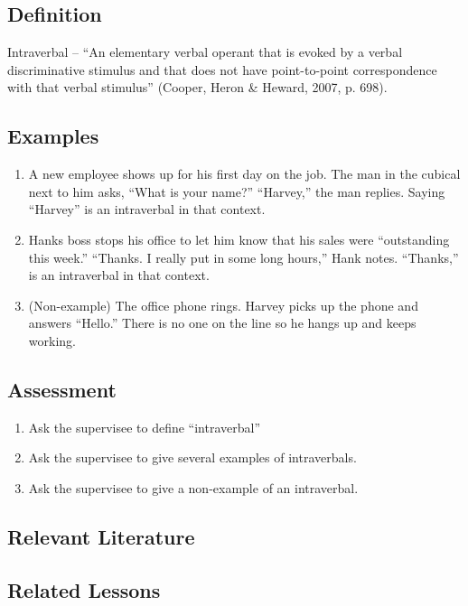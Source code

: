 \subsection{Definition} 
Intraverbal – ``An elementary verbal operant that is evoked by a verbal discriminative stimulus and that does not have point-to-point correspondence with that verbal stimulus'' (Cooper, Heron \& Heward, 2007, p. 698).
%
\subsection{Examples}
\begin{enumerate}
\item A new employee shows up for his first day on the job. The man in the cubical next to him asks, ``What is your name?''  ``Harvey,'' the man replies. Saying ``Harvey'' is an intraverbal in that context.
\item Hanks boss stops his office to let him know that his sales were ``outstanding this week.''  ``Thanks. I really put in some long hours,'' Hank notes.  ``Thanks,'' is an intraverbal in that context.
\item (Non-example) The office phone rings. Harvey picks up the phone and answers ``Hello.'' There is no one on the line so he hangs up and keeps working. 
%
\end{enumerate}
%
\subsection{Assessment}
\begin{enumerate}
\item Ask the supervisee to define ``intraverbal''  
\item Ask the supervisee to give several examples of intraverbals.
\item Ask the supervisee to give a non-example of an intraverbal.
%
\end{enumerate}
%
\subsection{Relevant Literature}
\begin{refsection}
\nocite{cooper2007applied,
        partington1993teaching,
        skinner1957verbal}
\printbibliography[heading=none]
\end{refsection}
%
\subsection{Related Lessons}
\fourdThirteen{}\\
